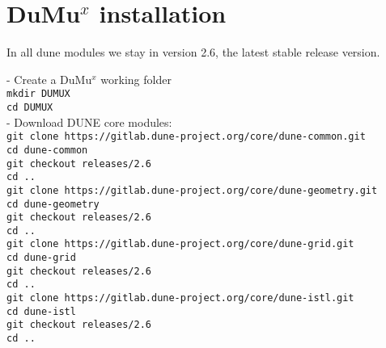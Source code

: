 \section*{DuMu$^x$ installation}
In all dune modules we stay in version 2.6, the latest stable release version. 

- Create a DuMu$^x$ working folder\\
\lstinline{mkdir DUMUX}\\
\lstinline{cd DUMUX}\\
- Download DUNE core modules:\\
\texttt{git clone https://gitlab.dune-project.org/core/dune-common.git}\\
    \hspace{\parindent} \texttt{cd dune-common}\\
    \hspace{\parindent} \texttt{git checkout releases/2.6}\\
		\hspace{\parindent} \texttt{cd ..}\\
\texttt{git clone https://gitlab.dune-project.org/core/dune-geometry.git}\\
    \hspace{\parindent} \texttt{cd dune-geometry}\\
    \hspace{\parindent} \texttt{git checkout releases/2.6}\\
		\hspace{\parindent} \texttt{cd ..}\\
\texttt{git clone https://gitlab.dune-project.org/core/dune-grid.git}\\
    \hspace{\parindent} \texttt{cd dune-grid}\\
    \hspace{\parindent} \texttt{git checkout releases/2.6}\\
		\hspace{\parindent} \texttt{cd ..}\\
\texttt{git clone https://gitlab.dune-project.org/core/dune-istl.git}\\
    \hspace{\parindent} \texttt{cd dune-istl}\\
    \hspace{\parindent} \texttt{git checkout releases/2.6}\\
		\hspace{\parindent} \texttt{cd ..}\\
